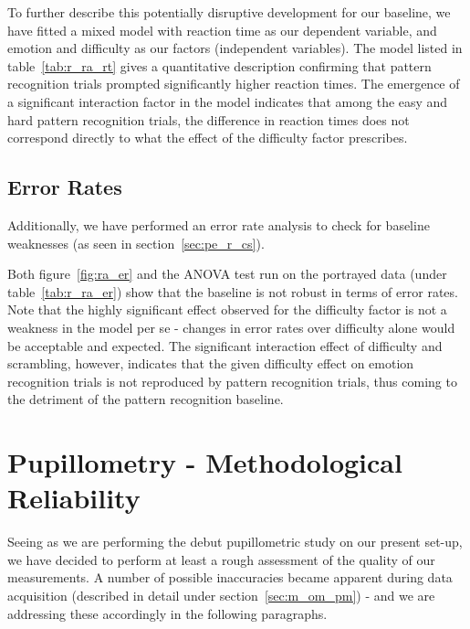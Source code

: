 	    To further describe this potentially disruptive development for our baseline, we have fitted a mixed model with reaction time as our dependent variable, and emotion and difficulty as our factors (independent variables).
	    The model listed in table~\ref{tab:r_ra_rt} gives a quantitative description confirming that pattern recognition trials prompted significantly higher reaction times.
	    The emergence of a significant interaction factor in the model indicates that among the easy and hard pattern recognition trials, the difference in reaction times does not correspond directly to what the effect of the difficulty factor prescribes.
	\subsection{Error Rates}\label{sec:r_ra_er}
	    Additionally, we have performed an error rate analysis to check for baseline weaknesses (as seen in section~\ref{sec:pe_r_cs}).
	    
	    Both figure~\ref{fig:ra_er} and the ANOVA test run on the portrayed data (under table~\ref{tab:r_ra_er}) show that the baseline is not robust in terms of error rates.
	    Note that the highly significant effect observed for the difficulty factor is not a weakness in the model per se - changes in error rates over difficulty alone would be acceptable and expected.
	    The significant interaction effect of difficulty and scrambling, however, indicates that the given difficulty effect on emotion recognition trials is not reproduced by pattern recognition trials, thus coming to the detriment of the pattern recognition baseline.	    
    
    \section{Pupillometry - Methodological Reliability}\label{sec:r_p}
	Seeing as we are performing the debut pupillometric study on our present set-up, we have decided to perform at least a rough assessment of the quality of our measurements.
	A number of possible inaccuracies became apparent during data acquisition (described in detail under section~\ref{sec:m_om_pm}) - 
	and we are addressing these accordingly in the following paragraphs.
	
